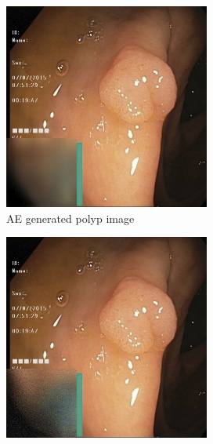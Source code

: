 \begin{figure}
\begin{subfigure}[t]{\myfigsizethree}
            \includegraphics[width=\textwidth]{experiments/figures/greensquare/normalmissAE.png}
            \caption{AE generated polyp image }   
            \label{fig:polyp_AE_SQUARE2}
        \end{subfigure}
        \qquad
        \begin{subfigure}[t]{\myfigsizethree}  
            \centering 
            \includegraphics[width=\textwidth]{experiments/figures/greensquare/normalmissGAN.png}

\end{subfigure}
\end{figure}
